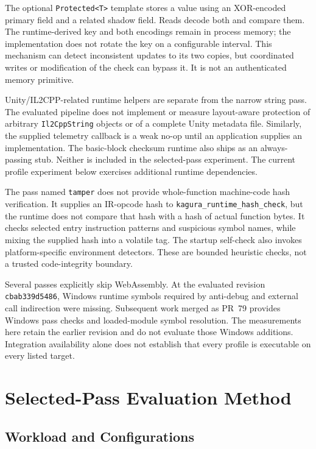 \documentclass[conference]{IEEEtran}
\begin{document}
The optional \texttt{Protected<T>} template stores a value using an
XOR-encoded primary field and a related shadow field. Reads decode
both and compare them. The runtime-derived key and both encodings
remain in process memory; the implementation does not rotate the key
on a configurable interval. This mechanism can detect inconsistent
updates to its two copies, but coordinated writes or modification of
the check can bypass it. It is not an authenticated memory primitive.

Unity/IL2CPP-related runtime helpers are separate from the narrow
string pass. The evaluated pipeline does not implement or measure
layout-aware protection of arbitrary \texttt{Il2CppString} objects or
of a complete Unity metadata file. Similarly, the supplied telemetry
callback is a weak no-op until an application supplies an implementation.
The basic-block checksum runtime also ships as an always-passing stub.
Neither is included in the selected-pass experiment. The current profile
experiment below exercises additional runtime dependencies.

The pass named \texttt{tamper} does not provide whole-function machine-code
hash verification. It supplies an IR-opcode hash to
\texttt{kagura\_runtime\_hash\_check}, but the runtime does not compare that
hash with a hash of actual function bytes. It checks selected entry
instruction patterns and suspicious symbol names, while mixing the supplied
hash into a volatile tag. The startup self-check also invokes
platform-specific environment detectors. These are bounded heuristic checks,
not a trusted code-integrity boundary.

Several passes explicitly skip WebAssembly. At the evaluated revision
\texttt{cbab339d5486}, Windows runtime symbols required by anti-debug and
external call indirection were missing. Subsequent work merged as PR~79
provides Windows pass checks and loaded-module symbol resolution. The
measurements here retain the earlier revision and do not evaluate those
Windows additions. Integration availability alone does not establish that
every profile is executable on every listed target.

\section{Selected-Pass Evaluation Method}
\label{sec:method}

\subsection{Workload and Configurations}
\end{document}
